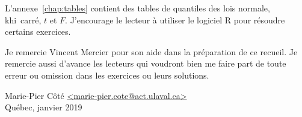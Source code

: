 L'annexe~\ref{chap:tables} contient des tables de quantiles des lois normale, khi~carré, $t$ et $F$. J'encourage le lecteur à utiliser le logiciel \textsf{R} \citep{R} pour résoudre certains exercices.

Je remercie Vincent Mercier pour son aide dans la préparation de ce recueil. Je remercie aussi d'avance les lecteurs qui voudront bien me faire
part de toute erreur ou omission dans les exercices ou leurs
solutions.

\begin{flushright}
  Marie-Pier Côté \url{<marie-pier.cote@act.ulaval.ca>} \\
  Québec, janvier 2019
\end{flushright}

